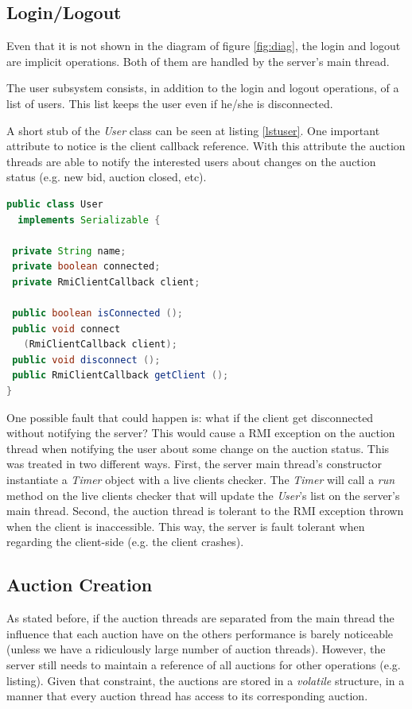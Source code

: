 \documentclass[twocolumn,10pt]{article}
\begin{document}
\subsection{Login/Logout}
Even that it is not shown in the diagram of figure \ref{fig:diag}, the login and logout are implicit operations. Both of them are handled by the server's main thread.

The user subsystem consists, in addition to the login and logout operations, of a list of users. This list keeps the user even if he/she is disconnected.

A short stub of the \textit{User} class can be seen at listing \ref{lstuser}. One important attribute to notice is the client callback reference. With this attribute the auction threads are able to notify the interested users about changes on the auction status (e.g. new bid, auction closed, etc).

\begin{lstlisting}[caption=\textit{User} class main methods and attributes, label=lstuser, language=java]
public class User 
  implements Serializable {
	
 private String name;
 private boolean connected;
 private RmiClientCallback client;

 public boolean isConnected ();
 public void connect 
   (RmiClientCallback client);				
 public void disconnect ();
 public RmiClientCallback getClient ();
}
\end{lstlisting}

One possible fault that could happen is: what if the client get disconnected without notifying the server? This would cause a RMI exception on the auction thread when notifying the user about some change on the auction status. This was treated in two different ways. First, the server main thread's constructor instantiate a \textit{Timer} object with a live clients checker. The \textit{Timer} will call a \textit{run} method on the live clients checker that will update the \textit{User}'s list on the server's main thread. Second, the auction thread is tolerant to the RMI exception thrown when the client is inaccessible. This way, the server is fault tolerant when regarding the client-side (e.g. the client crashes).

\subsection{Auction Creation}
As stated before, if the auction threads are separated from the main thread the influence that each auction have on the others performance is barely noticeable (unless we have a  ridiculously large number of auction threads). However, the server still needs to maintain a reference of all auctions for other operations (e.g. listing). Given that constraint, the auctions are stored in a \textit{volatile} structure, in a manner that every auction thread has access to its corresponding auction. 
\end{document}
